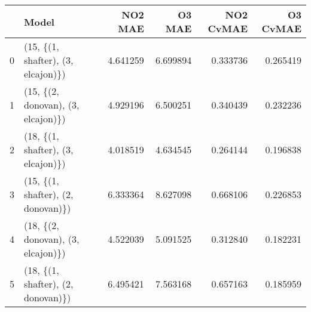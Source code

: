 \begin{tabular}{llrrrr}
\toprule
{} &                               Model &   NO2 MAE &    O3 MAE &  NO2 CvMAE &  O3 CvMAE \\
\midrule
0 &  (15, \{(1, shafter), (3, elcajon)\}) &  4.641259 &  6.699894 &   0.333736 &  0.265419 \\
1 &  (15, \{(2, donovan), (3, elcajon)\}) &  4.929196 &  6.500251 &   0.340439 &  0.232236 \\
2 &  (18, \{(1, shafter), (3, elcajon)\}) &  4.018519 &  4.634545 &   0.264144 &  0.196838 \\
3 &  (15, \{(1, shafter), (2, donovan)\}) &  6.333364 &  8.627098 &   0.668106 &  0.226853 \\
4 &  (18, \{(2, donovan), (3, elcajon)\}) &  4.522039 &  5.091525 &   0.312840 &  0.182231 \\
5 &  (18, \{(1, shafter), (2, donovan)\}) &  6.495421 &  7.563168 &   0.657163 &  0.185959 \\
\bottomrule
\end{tabular}

